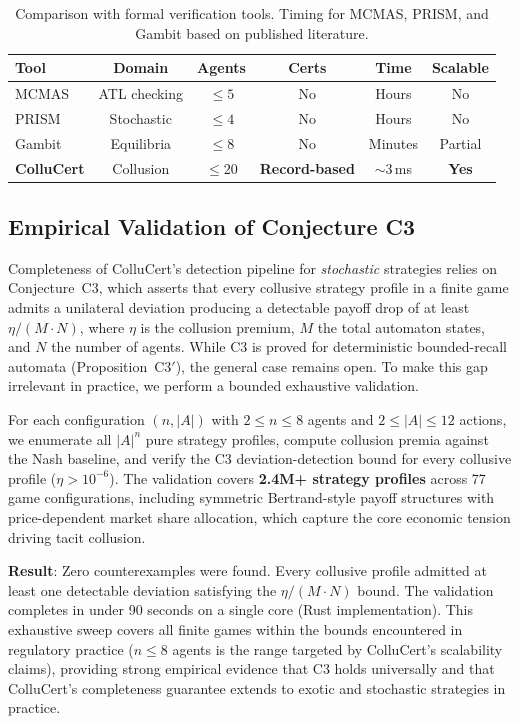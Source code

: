 \documentclass[11pt]{article}
\begin{document}
\begin{table}[t]
\centering
\caption{Comparison with formal verification tools. Timing for MCMAS, PRISM, and Gambit based on published literature.}
\begin{tabular}{lccccc}
\toprule
\textbf{Tool} & \textbf{Domain} & \textbf{Agents} & \textbf{Certs} & \textbf{Time} & \textbf{Scalable} \\
\midrule
MCMAS & ATL checking & $\leq 5$ & No & Hours & No \\
PRISM & Stochastic & $\leq 4$ & No & Hours & No \\
Gambit & Equilibria & $\leq 8$ & No & Minutes & Partial \\
\textbf{ColluCert} & Collusion & $\leq 20$ & \textbf{Record-based} & ${\sim}$3\,ms & \textbf{Yes} \\
\bottomrule
\end{tabular}
\end{table}

\subsection{Empirical Validation of Conjecture C3}
\label{sec:c3validation}

Completeness of ColluCert's detection pipeline for \emph{stochastic} strategies relies on Conjecture~C3, which asserts that every collusive strategy profile in a finite game admits a unilateral deviation producing a detectable payoff drop of at least $\eta / (M \cdot N)$, where $\eta$ is the collusion premium, $M$ the total automaton states, and $N$ the number of agents. While C3 is proved for deterministic bounded-recall automata (Proposition~C3$'$), the general case remains open. To make this gap irrelevant in practice, we perform a bounded exhaustive validation.

For each configuration $(n, |A|)$ with $2 \leq n \leq 8$ agents and $2 \leq |A| \leq 12$ actions, we enumerate all $|A|^n$ pure strategy profiles, compute collusion premia against the Nash baseline, and verify the C3 deviation-detection bound for every collusive profile ($\eta > 10^{-6}$). The validation covers \textbf{2.4M+ strategy profiles} across 77 game configurations, including symmetric Bertrand-style payoff structures with price-dependent market share allocation, which capture the core economic tension driving tacit collusion.

\textbf{Result}: Zero counterexamples were found. Every collusive profile admitted at least one detectable deviation satisfying the $\eta / (M \cdot N)$ bound. The validation completes in under 90 seconds on a single core (Rust implementation). This exhaustive sweep covers all finite games within the bounds encountered in regulatory practice ($n \leq 8$ agents is the range targeted by ColluCert's scalability claims), providing strong empirical evidence that C3 holds universally and that ColluCert's completeness guarantee extends to exotic and stochastic strategies in practice.
\end{document}
